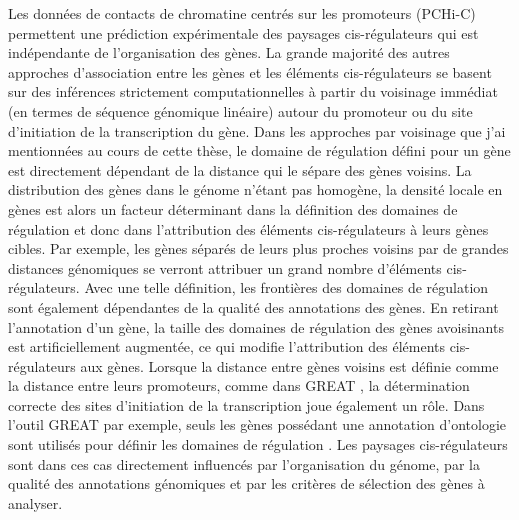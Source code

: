 Les données de contacts de chromatine centrés sur les promoteurs (\acrshort{PCHi-C}) permettent une prédiction expérimentale des paysages \gls{cis}-régulateurs qui est indépendante de l’organisation des gènes. La grande majorité des autres approches d’association entre les gènes et les éléments \gls{cis}-régulateurs se basent sur des inférences strictement computationnelles à partir du voisinage immédiat (en termes de séquence génomique linéaire) autour du promoteur ou du site d’initiation de la transcription du gène. Dans les approches par voisinage que j’ai mentionnées au cours de cette thèse, le domaine de régulation défini pour un gène est directement dépendant de la distance qui le sépare des gènes voisins. La distribution des gènes dans le génome n’étant pas homogène, la densité locale en gènes est alors un facteur déterminant dans la définition des domaines de régulation et donc dans l’attribution des éléments \gls{cis}-régulateurs à leurs gènes cibles. Par exemple, les gènes séparés de leurs plus proches voisins par de grandes distances génomiques se verront attribuer un grand nombre d’éléments \gls{cis}-régulateurs. Avec une telle définition, les frontières des domaines de régulation sont également dépendantes de la qualité des annotations des gènes. En retirant l’annotation d’un gène, la taille des domaines de régulation des gènes avoisinants est artificiellement augmentée, ce qui modifie l’attribution des éléments \gls{cis}-régulateurs aux gènes. Lorsque la distance entre gènes voisins est définie comme la distance entre leurs promoteurs, comme dans GREAT \citep{mclean_great_2010}, la détermination correcte des sites d’initiation de la transcription joue également un rôle. Dans l’outil GREAT par exemple, seuls les gènes possédant une annotation d’ontologie sont utilisés pour définir les domaines de régulation \citep{mclean_great_2010}. Les paysages \gls{cis}-régulateurs sont dans ces cas directement influencés par l'organisation du génome, par la qualité des annotations génomiques et par les critères de sélection des gènes à analyser. \\

